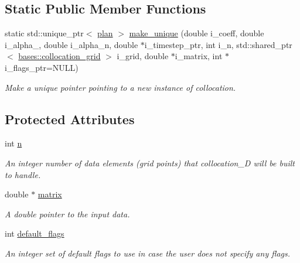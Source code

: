 \subsection*{Static Public Member Functions}
\begin{DoxyCompactItemize}
\item 
static std\-::unique\-\_\-ptr$<$ \hyperlink{classbases_1_1plan_a7b4ddc2f876b9e4dcf899feb20ae369f}{plan} $>$ \hyperlink{classone__d_1_1implicit__diffusion_a03c2ed0f0359538d5d2c928c23df9038}{make\-\_\-unique} (double i\-\_\-coeff, double i\-\_\-alpha\-\_, double i\-\_\-alpha\-\_\-n, double $\ast$i\-\_\-timestep\-\_\-ptr, int i\-\_\-n, std\-::shared\-\_\-ptr$<$ \hyperlink{classbases_1_1collocation__grid}{bases\-::collocation\-\_\-grid} $>$ i\-\_\-grid, double $\ast$i\-\_\-matrix, int $\ast$i\-\_\-flags\-\_\-ptr=N\-U\-L\-L)
\begin{DoxyCompactList}\small\item\em Make a unique pointer pointing to a new instance of collocation. \end{DoxyCompactList}\end{DoxyCompactItemize}
\subsection*{Protected Attributes}
\begin{DoxyCompactItemize}
\item 
\hypertarget{classbases_1_1implicit__plan_a43fa2adfff9e68a66a23cf03b027a32d}{int \hyperlink{classbases_1_1implicit__plan_a43fa2adfff9e68a66a23cf03b027a32d}{n}}\label{classbases_1_1implicit__plan_a43fa2adfff9e68a66a23cf03b027a32d}

\begin{DoxyCompactList}\small\item\em An integer number of data elements (grid points) that collocation\-\_\-D will be built to handle. \end{DoxyCompactList}\item 
\hypertarget{classbases_1_1implicit__plan_af9d3db062039649e63a7fe1f83a9d155}{double $\ast$ \hyperlink{classbases_1_1implicit__plan_af9d3db062039649e63a7fe1f83a9d155}{matrix}}\label{classbases_1_1implicit__plan_af9d3db062039649e63a7fe1f83a9d155}

\begin{DoxyCompactList}\small\item\em A double pointer to the input data. \end{DoxyCompactList}\item 
\hypertarget{classbases_1_1plan_a756595e230cc99e84de4392ac691eefd}{int \hyperlink{classbases_1_1plan_a756595e230cc99e84de4392ac691eefd}{default\-\_\-flags}}\label{classbases_1_1plan_a756595e230cc99e84de4392ac691eefd}

\begin{DoxyCompactList}\small\item\em An integer set of default flags to use in case the user does not specify any flags. \end{DoxyCompactList}\end{DoxyCompactItemize}


